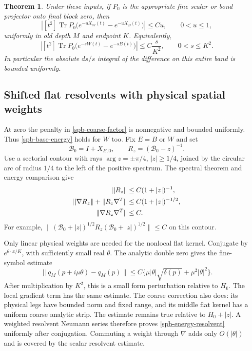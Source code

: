 \documentclass[11pt]{article}
\newtheorem{theorem}{Theorem}[section]
\theoremstyle{remark}
\begin{document}
\begin{theorem}
\label{spb-main}
Under these inputs, if $P_0$ is the appropriate fine scalar or bond
projector onto final block zero, then
\begin{equation}
 \left|[t^2]\operatorname{Tr}
 P_0\bigl(e^{-uX_W(t)}-e^{-uX_B(t)}\bigr)\right|
       \le Cu,\qquad 0<u\le1,
 \label{spb-physical-bound}
\end{equation}
uniformly in old depth $M$ and endpoint $K$. Equivalently,
\begin{equation}
 \left|[t^2]\operatorname{Tr}
 P_0\bigl(e^{-sW(t)}-e^{-sB(t)}\bigr)\right|
       \le C\frac{s}{K^2},\qquad 0<s\le K^2.
 \label{spb-fine-bound}
\end{equation}
In particular the absolute $ds/s$ integral of the difference on this
entire band is bounded uniformly.
\end{theorem}

\subsection{Shifted flat resolvents with physical spatial weights}
\label{spb-resolvents}

At zero the penalty in \eqref{spb-coarse-factor} is nonnegative and
bounded uniformly. Thus \eqref{spb-base-energy} holds for $W$ too.
Fix $E=B$ or $W$ and set
\[
 \mathcal B_0=I+X_{E,0},\qquad R_z=(\mathcal B_0-z)^{-1}.
\]
Use a sectorial contour with rays $\arg z=\pm\pi/4$, $|z|\ge1/4$,
joined by the circular arc of radius $1/4$ to the left of the positive
spectrum. The spectral theorem and energy comparison give
\begin{align}
 \|R_z\|&\le C(1+|z|)^{-1},\notag\\
 \|\nabla R_z\|+\|R_z\nabla^T\|
      &\le C(1+|z|)^{-1/2},\notag\\
 \|\nabla R_z\nabla^T\|&\le C.
 \label{spb-energy-resolvent}
\end{align}
For example,
$\|(\mathcal B_0+|z|)^{1/2}R_z
(\mathcal B_0+|z|)^{1/2}\|\le C$ on this contour.

Only linear physical weights are needed for the nonlocal flat kernel.
Conjugate by $e^{\theta\cdot x/K}$, with sufficiently small real
$\theta$. The analytic double zero gives the fine-symbol estimate
\[
 \|q_M(p+i\mu\theta)-q_M(p)\|
 \le C\{\mu|\theta|\sqrt{\delta(p)}+\mu^2|\theta|^2\}.
\]
After multiplication by $K^2$, this is a small form perturbation
relative to $H_0$. The local gradient term has the same estimate.
The coarse correction also does: its physical legs have bounded norm
and fixed range, and its middle flat kernel has a uniform coarse
analytic strip. The estimate remains true relative to $H_0+|z|$.
A weighted resolvent Neumann series therefore proves
\eqref{spb-energy-resolvent} uniformly after conjugation.
Commuting a weight through $\nabla$ adds only $O(|\theta|)$ and
is covered by the scalar resolvent estimate.
\end{document}
